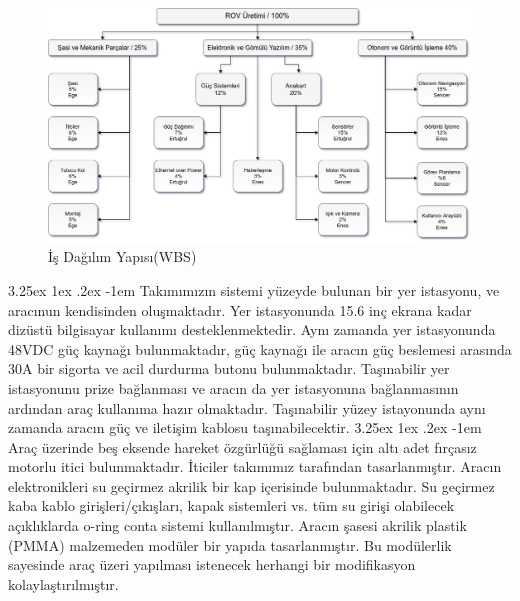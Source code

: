 \documentclass[12pt]{article}
\makeatletter
\renewcommand\paragraph{\@startsection{paragraph}{5}{\z@}%
  {3.25ex \@plus1ex \@minus.2ex}%
  {-1em}%
  {\normalfont\normalsize\bfseries}}
\makeatother
\begin{document}
\begin{figure}[hbt!]
\centering
\includegraphics[width=1\textwidth]{images/WBS-update.png}
\caption{İş Dağılım Yapısı(WBS)}
\label{fig:wbs}
\end{figure}

\paragraph{} Takımımızın sistemi yüzeyde bulunan bir yer istasyonu, ve aracınun kendisinden oluşmaktadır. Yer istasyonunda 15.6 inç ekrana kadar dizüstü bilgisayar kullanımı desteklenmektedir. Aynı zamanda yer istasyonunda 48VDC güç kaynağı bulunmaktadır, güç kaynağı ile aracın güç beslemesi arasında 30A bir sigorta ve acil durdurma butonu bulunmaktadır. Taşınabilir yer istasyonunu prize bağlanması ve aracın da yer istasyonuna bağlanmasının ardından araç kullanıma hazır olmaktadır. Taşınabilir yüzey istayonunda aynı zamanda aracın güç ve iletişim kablosu taşınabilecektir. 
\newpage
\paragraph{} Araç üzerinde beş eksende hareket özgürlüğü sağlaması için altı adet fırçasız motorlu itici bulunmaktadır. İticiler takımımız tarafından tasarlanmıştır. Aracın elektronikleri su geçirmez akrilik bir kap içerisinde bulunmaktadır. Su geçirmez kaba kablo girişleri/çıkışları, kapak sistemleri vs. tüm su girişi olabilecek açıklıklarda o-ring conta sistemi kullanılmıştır.\cite{BOOK:o-ring} Aracın şasesi akrilik plastik (PMMA) malzemeden modüler bir yapıda tasarlanmıştır. Bu modülerlik sayesinde araç üzeri yapılması istenecek herhangi bir modifikasyon kolaylaştırılmıştır.
\end{document}
